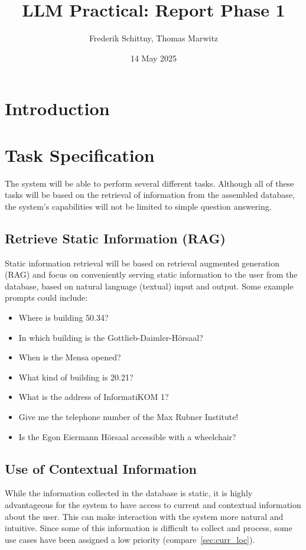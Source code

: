 \documentclass{article}
\title{LLM Practical: Report Phase 1}
\author{Frederik Schittny, Thomas Marwitz}
\date{14 May 2025}
\begin{document}
\maketitle

\section{Introduction}

\section{Task Specification}
The system will be able to perform several different tasks. Although all of these tasks will be based on the retrieval of information from the assembled database, the system's capabilities will not be limited to simple question answering.

\subsection{Retrieve Static Information (RAG)} \label{sec:stat_info}
Static information retrieval will be based on retrieval augmented generation (RAG) and focus on conveniently serving static information to the user from the database, based on natural language (textual) input and output. Some example prompts could include:
  \begin{itemize}
      \item Where is building 50.34?
      \item In which building is the Gottlieb-Daimler-Hörsaal?
      \item When is the Mensa opened?
      \item What kind of building is 20.21?
      \item What is the address of InformatiKOM 1?
      \item Give me the telephone number of the Max Rubner Institute!
      \item Is the Egon Eiermann Hörsaal accessible with a wheelchair?
  \end{itemize}

\subsection{Use of Contextual Information}
While the information collected in the database is static, it is highly advantageous for the system to have access to current and contextual information about the user. This can make interaction with the system more natural and intuitive. Since some of this information is difficult to collect and process, some use cases have been assigned a low priority (compare~\ref{sec:curr_loc}).
\end{document}
